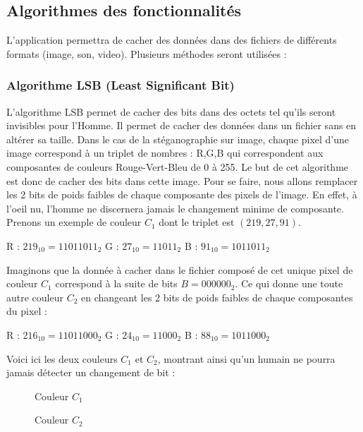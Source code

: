 \documentclass[11pt]{article}
\begin{document}
\normalsize
\subsection{Algorithmes des fonctionnalités}
L'application permettra de cacher des données dans des fichiers de différents formats (image, son, video). 
Plusieurs méthodes seront utilisées : 

\subsubsection{Algorithme LSB (Least Significant Bit)}
L'algorithme LSB permet de cacher des bits dans des octets tel qu'ils seront invisibles pour l'Homme. 
Il permet de cacher des données dans un fichier sans en altérer sa taille. 
Dans le cas de la stéganographie sur image, chaque pixel d'une image correspond à un triplet de nombres : R,G,B qui correspondent aux composantes de couleurs Rouge-Vert-Bleu de 0 à 255. 
Le but de cet algorithme est donc de cacher des bits dans cette image. Pour se faire, nous allons remplacer les 2 bits de poids faibles de chaque composante des pixels de l'image. 
En effet, à l'oeil nu, l'homme ne discernera jamais le changement minime de composante. 
Prenons un exemple de couleur $C_1$ dont le triplet est $(219,27,91)$. 

R : $219_{10} = 11011011_2$	\qquad G : $27_{10} = 11011_2$ \qquad B : $91_{10} = 1011011_2$


Imaginons que la donnée à cacher dans le fichier composé de cet unique pixel de couleur $C_1$ correspond à la suite de bits $B = 000000_2$.
Ce qui donne une toute autre couleur $C_2$ en changeant les 2 bits de poids faibles de chaque composantes du pixel : 

R : $216_{10} = 11011000_2$ \qquad G : $24_{10} = 11000_2$ \qquad B : $88_{10} = 1011000_2$


Voici ici les deux couleurs $C_1$ et $C_2$, montrant ainsi qu'un humain ne pourra jamais détecter un changement de bit : 

\begin{figure}[h]
 \begin{minipage}{.46\linewidth}
  \centering{}
  \caption{Couleur $C_1$}
 \end{minipage} \hfill
 \begin{minipage}{.46\linewidth}
  \centering{}
  \caption{Couleur $C_2$}
 \end{minipage}
\end{figure}
\end{document}
